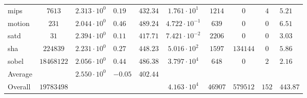 \begin{tabular}{|l|c|HHc|c|c|c|cH|}
mips          & $ 7613     $ & $ 2.313 \cdot 10^{0} $ & $ 0.19  $ & $ 432.34 $ & $ 1.761 \cdot 10^{1}  $ & $ 1214  $ & $ 0      $ & $ 4   $ & $ 5.21    $ \\
motion        & $ 231      $ & $ 2.044 \cdot 10^{0} $ & $ 0.46  $ & $ 489.24 $ & $ 4.722 \cdot 10^{-1} $ & $ 639   $ & $ 0      $ & $ 0   $ & $ 6.51    $ \\
satd          & $ 31       $ & $ 2.394 \cdot 10^{0} $ & $ 0.11  $ & $ 417.71 $ & $ 7.421 \cdot 10^{-2} $ & $ 2206  $ & $ 0      $ & $ 0   $ & $ 3.03    $ \\
sha           & $ 224839   $ & $ 2.231 \cdot 10^{0} $ & $ 0.27  $ & $ 448.23 $ & $ 5.016 \cdot 10^{2}  $ & $ 1597  $ & $ 134144 $ & $ 0   $ & $ 5.86    $ \\
sobel         & $ 18468122 $ & $ 2.056 \cdot 10^{0} $ & $ 0.44  $ & $ 486.38 $ & $ 3.797 \cdot 10^{4}  $ & $ 648   $ & $ 0      $ & $ 2   $ & $ 2.16    $ \\
\hline
Average       & $          $ & $ 2.550 \cdot 10^{0} $ & $ -0.05 $ & $ 402.44 $ & $                     $ & $       $ & $        $ & $     $ & $         $ \\
\hline
Overall       & $ 19783498 $ & $                    $ & $       $ & $        $ & $ 4.163 \cdot 10^{4}  $ & $ 46907 $ & $ 579512 $ & $ 152 $ & $ 443.87  $ \\
\hline
\end{tabular}
